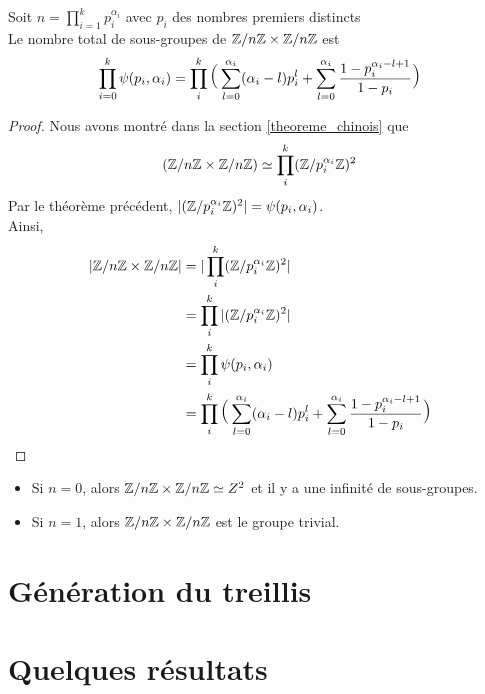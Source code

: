 \documentclass[12pt]{article}
\newcommand{\ZnZ}{\Z/n\Z}
\newcommand{\ZZ}{\ZnZ \x \ZnZ}
\begin{document}
\begin{proposition}
	Soit $n = \prod\limits_{i = 1}^k p_i^{\alpha_i}$ avec $p_i$ des nombres premiers distincts\\
	Le nombre total de sous-groupes de $\ZZ$ est
	$$\prod_{i = 0}^{k} \psi(p_i,\alpha_i)
		= \prod_i^k\mlarge[3](\sum_{l=0}^{\alpha_i}(\alpha_i-l)p_i^l +%
		\sum_{l = 0}^{\alpha_i}\frac{1- p_i^{\alpha_i-l+1}}{1 - p_i}\mlarge[3])$$
\end{proposition}

\begin{proof}
	Nous avons montré dans la section \ref{theoreme_chinois} que
	$$(\ZZ) \isom \prod_i^k(\Z/p_i^{\alpha_i}\Z)^2$$
	Par le théorème précédent, $|(\mathbb Z/p_i^{\alpha_i}\mathbb Z)^2| = \psi(p_i, \alpha_i)$.\\
	Ainsi,
	\begin{equation*}
		\begin{split}
			|\ZZ| &= |\prod_i^k(\Z/p_i^{\alpha_i}\Z)^2|\\
			&= \prod_i^k|(\Z/p_i^{\alpha_i}\Z)^2|\\
			&= \prod_i^k\psi(p_i,\alpha_i)\\
			&= \prod_i^k\mlarge[3](\sum_{l=0}^{\alpha_i}(\alpha_i-l)p_i^l +%
			\sum_{l = 0}^{\alpha_i}\frac{1- p_i^{\alpha_i-l+1}}{1 - p_i}\mlarge[3])
		\end{split}
	\end{equation*}
\end{proof}

\begin{remark}
	\hfill
	\begin{itemize}
		\item Si $n = 0$, alors $\ZZ \isom Z^2$ et il y a une infinité de sous-groupes.
		\item Si $n = 1$, alors $\ZZ$ est le groupe trivial.
	\end{itemize}

\end{remark}
\newpage
\section{Génération du treillis}

\newpage
\section{Quelques résultats}
\end{document}
